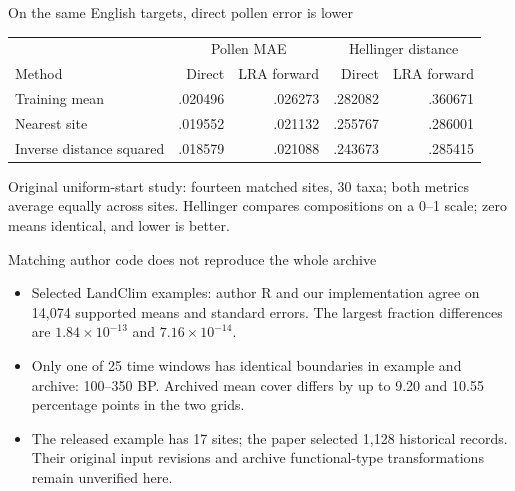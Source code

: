 \begin{frame}{On the same English targets, direct pollen error is lower}
\small
\begin{tabular}{lrrrr}
\toprule
 & \multicolumn{2}{c}{Pollen MAE} & \multicolumn{2}{c}{Hellinger distance} \\
Method & Direct & LRA forward & Direct & LRA forward \\
\midrule
Training mean & .020496 & .026273 & .282082 & .360671 \\
Nearest site & .019552 & .021132 & .255767 & .286001 \\
Inverse distance squared & .018579 & .021088 & .243673 & .285415 \\
\bottomrule
\end{tabular}
\par\medskip
Original uniform-start study: fourteen matched sites, 30 taxa; both metrics average equally across sites. Hellinger compares compositions on a 0--1 scale; zero means identical, and lower is better.
\end{frame}

\begin{frame}{Matching author code does not reproduce the whole archive}
\begin{itemize}
\item Selected LandClim examples: author R and our implementation agree on 14,074 supported means and standard errors. The largest fraction differences are $1.84\times10^{-13}$ and $7.16\times10^{-14}$.
\item Only one of 25 time windows has identical boundaries in example and archive: 100--350 BP. Archived mean cover differs by up to 9.20 and 10.55 percentage points in the two grids.
\item The released example has 17 sites; the paper selected 1,128 historical records. Their original input revisions and archive functional-type transformations remain unverified here.
\end{itemize}
\end{frame}

